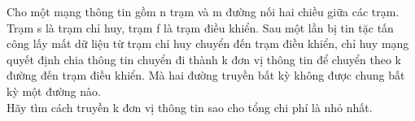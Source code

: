 Cho một mạng thông tin gồm n trạm và m đường nối hai chiều giữa các trạm. Trạm s là trạm chỉ huy, trạm f là trạm điều khiển. Sau một lần bị tin tặc tấn công lấy mất dữ liệu từ trạm chỉ huy chuyển đến trạm điều khiển, chỉ huy mạng quyết định chia thông tin chuyển đi thành k đơn vị thông tin để chuyển theo k đường đến trạm điều khiển. Mà hai đường truyền bất kỳ không được chung bất kỳ một đường nào.
\\Hãy tìm cách truyền k đơn vị thông tin sao cho tổng chi phí là nhỏ nhất.

\
